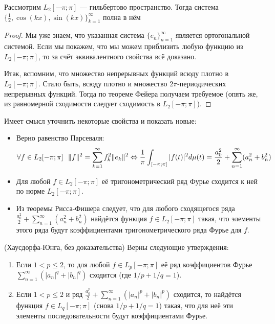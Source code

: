 \begin{proposition}
	Рассмотрим $L_2[-\pi; \pi]$ --- гильбертово пространство. Тогда система $\{\frac{1}{2}, \cos(kx), \sin(kx)\}_{k = 1}^\infty$ полна в нём
\end{proposition}

\begin{proof}
	Мы уже знаем, что указанная система $\{e_n\}_{n = 1}^\infty$ является ортогональной системой. Если мы покажем, что мы можем приблизить любую функцию из $L_2[-\pi; \pi]$, то за счёт эквивалентного свойства всё доказано.
	
	Итак, вспомним, что множество непрерывных функций всюду плотно в $L_2[-\pi; \pi]$. Стало быть, всюду плотно и множество $2\pi$-периодических непрерывных функций. Тогда по теореме Фейера получаем требуемое (опять же, из равномерной сходимости следует сходимость в $L_2[-\pi; \pi]$).
\end{proof}

\begin{corollary}
	Имеет смысл уточнить некоторые свойства и показать новые:
	\begin{itemize}
		\item Верно равенство Парсеваля:
		\[
			\forall f \in L_2[-\pi; \pi]\ \ \|f\|^2 = \sum_{k = 1}^\infty f_k^2\|e_k\|^2 \Leftrightarrow \frac{1}{\pi} \int_{[-\pi; \pi]} |f(t)|^2d\mu(t) = \frac{a_0^2}{2} + \sum_{n = 1}^\infty (a_n^2 + b_n^2)
		\]
		
		\item Для любой $f \in L_2[-\pi; \pi]$ её тригонометрический ряд Фурье сходится к ней по норме $L_2[-\pi; \pi]$.
		
		\item Из теоремы Рисса-Фишера следует, что для любого сходящегося ряда $\frac{a_0^2}{2} + \sum_{n = 1}^\infty (a_n^2 + b_n^2)$ найдётся функция $f \in L_2[-\pi; \pi]$ такая, что элементы этого ряда будут коэффициентами тригонометрического ряда Фурье для $f$.
	\end{itemize}
\end{corollary}

\begin{theorem} (Хаусдорфа-Юнга, без доказательства)
	Верны следующие утверждения:
	\begin{enumerate}
		\item Если $1 < p \le 2$, то для любой $f \in L_p[-\pi; \pi]$ её ряд коэффициентов Фурье $\sum_{n = 1}^\infty (|a_n|^q + |b_n|^q)$ сходится (где $1 / p + 1 / q = 1$).
		
		\item Если $1 < p \le 2$ и ряд $\frac{a_0^p}{2} + \sum_{n = 1}^\infty (|a_n|^p + |b_n|^p)$ сходится, то найдётся функция $f \in L_q[-\pi; \pi]$ (снова $1 / p + 1 / q = 1$) такая, что для неё эти элементы последовательности будут коэффициентами Фурье.
	\end{enumerate}
\end{theorem}

